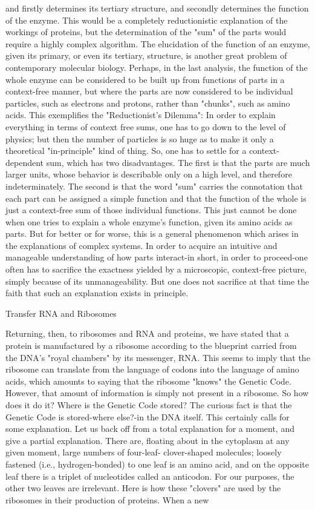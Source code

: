 {and firstly determines its tertiary structure, and secondly determines the function of the
enzyme. This would be a completely reductionistic explanation of the workings of proteins,
but the determination of the "sum" of the parts would require a highly complex algorithm.
The elucidation of the function of an enzyme, given its primary, or even its tertiary, structure,
is another great problem of contemporary molecular biology.
         Perhaps, in the last analysis, the function of the whole enzyme can be considered to
be built up from functions of parts in a context-free manner, but where the parts are now
considered to be individual particles, such as electrons and protons, rather than "chunks",
such as amino acids. This exemplifies the "Reductionist's Dilemma": In order to explain
everything in terms of context free sums, one has to go down to the level of physics; but then
the number of particles is so huge as to make it only a theoretical "in-principle" kind of thing.
So, one has to settle for a context-dependent sum, which has two disadvantages. The first is
that the parts are much larger units, whose behavior is describable only on a high level, and
therefore indeterminately. The second is that the word "sum" carries the connotation that
each part can be assigned a simple function and that the function of the whole is just a
context-free sum of those individual functions. This just cannot be done when one tries to
explain a whole enzyme's function, given its amino acids as parts. But for better or for worse,
this is a general phenomenon which arises in the explanations of complex systems. In order
to acquire an intuitive and manageable understanding of how parts interact-in short, in order
to proceed-one often has to sacrifice the exactness yielded by a microscopic, context-free
picture, simply because of its unmanageability. But one does not sacrifice at that time the
faith that such an explanation exists in principle.


                               Transfer RNA and Ribosomes

Returning, then, to ribosomes and RNA and proteins, we have stated that a protein is
manufactured by a ribosome according to the blueprint carried from the DNA's "royal
chambers" by its messenger, RNA. This seems to imply that the ribosome can translate from
the language of codons into the language of amino acids, which amounts to saying that the
ribosome "knows" the Genetic Code. However, that amount of information is simply not
present in a ribosome. So how does it do it? Where is the Genetic Code stored? The curious
fact is that the Genetic Code is stored-where else?-in the DNA itself. This certainly calls for
some explanation.
         Let us back off from a total explanation for a moment, and give a partial explanation.
There are, floating about in the cytoplasm at any given moment, large numbers of four-leaf-
clover-shaped molecules; loosely fastened (i.e., hydrogen-bonded) to one leaf is an amino
acid, and on the opposite leaf there is a triplet of nucleotides called an anticodon. For our
purposes, the other two leaves are irrelevant. Here is how these "clovers" are used by the
ribosomes in their production of proteins. When a new




}
